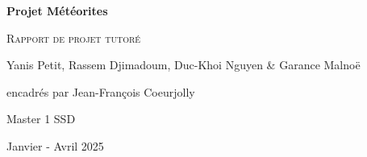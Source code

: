 \documentclass[12pt]{article}
\begin{document}
\begin{titlepage}
    \centering
    {\huge\bfseries Projet Météorites\par}
    \vspace{1cm}
    {\scshape\Large Rapport de projet tutoré\par}
    \vspace{1.5cm}
    {\large Yanis Petit, Rassem Djimadoum, Duc-Khoi Nguyen \& Garance Malnoë\par
    encadrés par Jean-François Coeurjolly\par}
    \vspace{0.5cm}
    {\large Master 1 SSD\par}
    \vspace{0.5cm}
    {\large Janvier - Avril 2025\par}
    \vspace{3cm}
\end{titlepage}
\tableofcontents
\clearpage
{}
\end{document}
